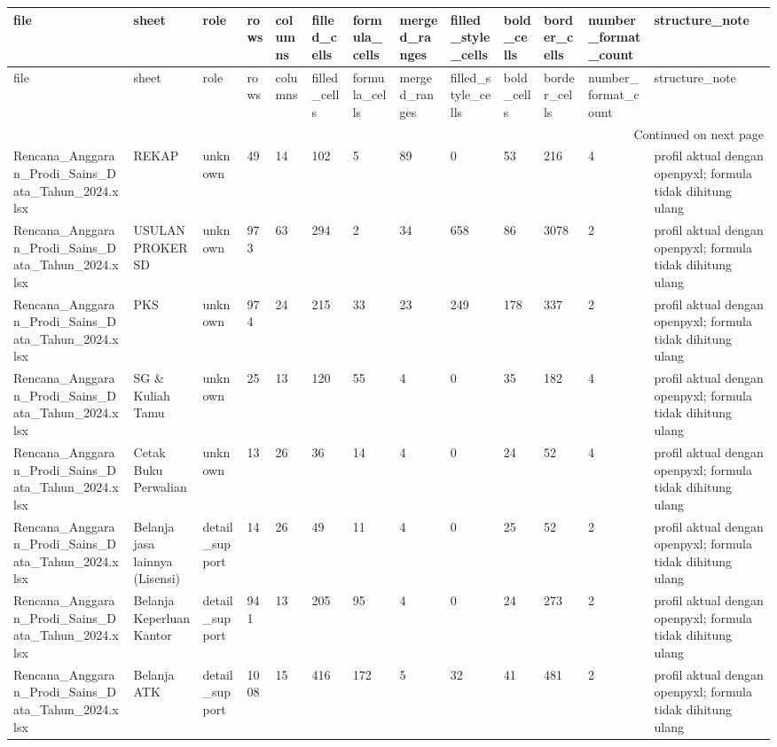 \begingroup
\scriptsize
\begin{longtable}{lllllllllllll}
\toprule
file & sheet & role & rows & columns & filled_cells & formula_cells & merged_ranges & filled_style_cells & bold_cells & border_cells & number_format_count & structure_note \\
\midrule
\endfirsthead
\toprule
file & sheet & role & rows & columns & filled_cells & formula_cells & merged_ranges & filled_style_cells & bold_cells & border_cells & number_format_count & structure_note \\
\midrule
\endhead
\midrule
\multicolumn{13}{r}{Continued on next page} \\
\midrule
\endfoot
\bottomrule
\endlastfoot
Rencana_Anggaran_Prodi_Sains_Data_Tahun_2024.xlsx & REKAP & unknown & 49 & 14 & 102 & 5 & 89 & 0 & 53 & 216 & 4 & profil aktual dengan openpyxl; formula tidak dihitung ulang \\
Rencana_Anggaran_Prodi_Sains_Data_Tahun_2024.xlsx & USULAN PROKER SD & unknown & 973 & 63 & 294 & 2 & 34 & 658 & 86 & 3078 & 2 & profil aktual dengan openpyxl; formula tidak dihitung ulang \\
Rencana_Anggaran_Prodi_Sains_Data_Tahun_2024.xlsx & PKS & unknown & 974 & 24 & 215 & 33 & 23 & 249 & 178 & 337 & 2 & profil aktual dengan openpyxl; formula tidak dihitung ulang \\
Rencana_Anggaran_Prodi_Sains_Data_Tahun_2024.xlsx & SG \& Kuliah Tamu & unknown & 25 & 13 & 120 & 55 & 4 & 0 & 35 & 182 & 4 & profil aktual dengan openpyxl; formula tidak dihitung ulang \\
Rencana_Anggaran_Prodi_Sains_Data_Tahun_2024.xlsx & Cetak Buku Perwalian & unknown & 13 & 26 & 36 & 14 & 4 & 0 & 24 & 52 & 4 & profil aktual dengan openpyxl; formula tidak dihitung ulang \\
Rencana_Anggaran_Prodi_Sains_Data_Tahun_2024.xlsx & Belanja jasa lainnya (Lisensi) & detail_support & 14 & 26 & 49 & 11 & 4 & 0 & 25 & 52 & 2 & profil aktual dengan openpyxl; formula tidak dihitung ulang \\
Rencana_Anggaran_Prodi_Sains_Data_Tahun_2024.xlsx & Belanja Keperluan Kantor & detail_support & 941 & 13 & 205 & 95 & 4 & 0 & 24 & 273 & 2 & profil aktual dengan openpyxl; formula tidak dihitung ulang \\
Rencana_Anggaran_Prodi_Sains_Data_Tahun_2024.xlsx & Belanja ATK & detail_support & 1008 & 15 & 416 & 172 & 5 & 32 & 41 & 481 & 2 & profil aktual dengan openpyxl; formula tidak dihitung ulang \\

\end{longtable}
